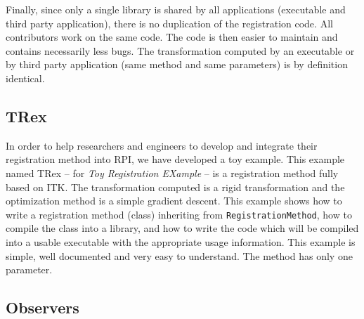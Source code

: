 Finally, since only a single library is shared by all applications (executable and third party application), there is no duplication of the registration code. All contributors work on the same code. The code is then easier to maintain and contains necessarily less bugs. The transformation computed by an executable or by third party application (same method and same parameters) is by definition identical.



\subsection{TRex}

In order to help researchers and engineers to develop and integrate their registration method into RPI, we have developed a toy example. This example named TRex -- for \textit{Toy Registration EXample} -- is a registration method fully based on ITK. The transformation computed is a rigid transformation and the optimization method is a simple gradient descent. This example shows how to write a registration method (class) inheriting from \texttt{RegistrationMethod}, how to compile the class into a library, and how to write the code which will be compiled into a usable executable with the appropriate usage information. This example is simple, well documented and very easy to understand. The method has only one parameter.



\subsection{Observers}

